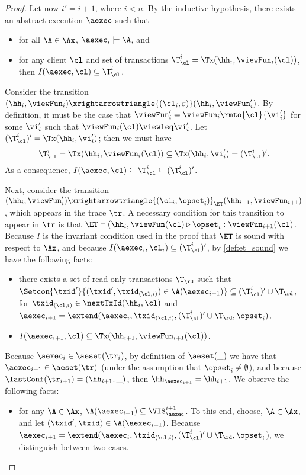 \begin{proof}
Let now $i' = i + 1$, where $i < n$.
By the inductive hypothesis, there exists an abstract execution $\aexec$ such that  
\begin{itemize}
\item for all $\A \in \Ax$, $\aexec_{i} \models \A$, and 
\item for any client $\cl$ and set of transactions $\T_{\cl}^{i} = \Tx(\hh_{i}, \viewFun_{i}(\cl))$, 
then $I(\aexec, \cl) \subseteq \T_{\cl}^{i}$.
\end{itemize}
Consider the transition $(\hh_{i}, \viewFun_{i}) \xrightarrowtriangle{(\cl_{i}, \varepsilon)} (\hh_{i}, \viewFun'_{i})$. 
By definition, it must be the case that $\viewFun'_{i} = \viewFun_{i}\rmto{\cl}{\vi'_{i}}$ 
for some $\vi'_{i}$ such that $\viewFun_{i}(\cl) \viewleq \vi'_{i}$.
Let $(\T_{\cl}^{i})' = \Tx(\hh_{i}, \vi'_{i})$; then we must have 
\[
\T_{\cl}^{i} = \Tx(\hh_{i}, \viewFun_{i}(\cl)) \subseteq \Tx(\hh_{i}, \vi'_{i}) = (\T_{\cl}^{i})'. 
\]
As a consequence, $I(\aexec, \cl) \subseteq \T_{\cl}^{i} \subseteq (\T_{\cl}^{i})'$.

Next, consider the transition $(\hh_{i}, \viewFun_{i}') \xrightarrowtriangle{(\cl_{i}, \opset_{i})}_{\ET} 
(\hh_{i+1}, \viewFun_{i+1})$, which appears in the trace $\tr$. A necessary condition for this transition 
to appear in $\tr$ is that $\ET \vdash (\hh_{i}, \viewFun(\cl) \triangleright \opset_{i}: \viewFun_{i+1}(\cl)$. 
Because $I$ is the invariant condition used in the proof that $\ET$ is sound with respect to $\Ax$, 
and because 
$I(\aexec_{i}, \cl_{i}) \subseteq (\T^{i}_{\cl})'$, 
by \cref{def:et_sound} we have the following facts: 
\begin{itemize}
\item there exists a set of read-only transactions $\T_\rd$ 
such that $\Setcon{\txid' }{ (\txid', \txid_{(\cl, i)}) \in \A(\aexec_{i+1})} \subseteq 
(\T^{i}_{\cl})' \cup \T_\rd$, for 
$\txid_{(\cl, i)} \in \nextTxId(\hh_{i}, \cl)$ and $\aexec_{i+1} = 
\extend(\aexec_{i}, \txid_{(\cl, i)}, (\T^{i}_{\cl})' \cup \T_\rd, \opset_{i})$, 
\item  $I(\aexec_{i+1}, \cl) \subseteq \Tx(\hh_{i+1}, \viewFun_{i+1}(\cl))$.
\end{itemize} 
Because $\aexec_{i} \in \aeset(\tr_{i})$, by definition of $\aeset(\_)$ we have that 
$\aexec_{i+1} \in \aeset(\tr)$ (under the assumption that $\opset_{i} \neq \emptyset$), 
and because $\lastConf(\tr_{i+1}) = (\hh_{i+1}, \_)$, then $\hh_{\aexec_{i+1}} = \hh_{i+1}$. 
We observe the following facts: 
\begin{itemize}
\item for any $\A \in \Ax$, $\A(\aexec_{i+1}) \subseteq \VIS_{\aexec}^{i+1}$. 
To this end, choose, $\A \in \Ax$, and let $(\txid', \txid) \in \A(\aexec_{i+1})$. 
Because $\aexec_{i+1} = \extend(\aexec_{i}, \txid_{(\cl, i)}, (\T_{\cl}^{i})' \cup \T_\rd, \opset_{i}$), 
we distinguish between two cases.


\end{itemize}
\end{proof}
